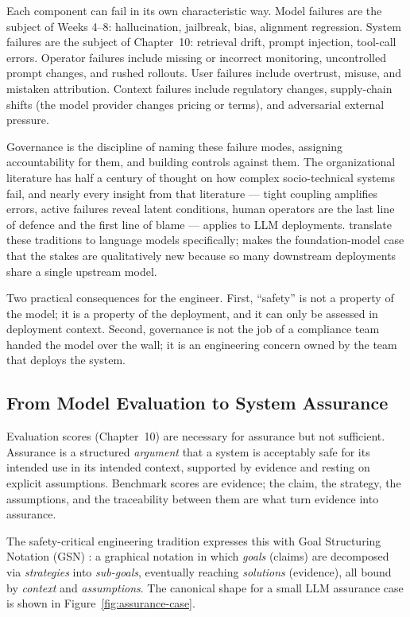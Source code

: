 Each component can fail in its own characteristic way. Model
failures are the subject of Weeks 4--8: hallucination,
jailbreak, bias, alignment regression. System failures are the
subject of Chapter~10: retrieval drift, prompt injection, tool-call
errors. Operator failures include missing or incorrect
monitoring, uncontrolled prompt changes, and rushed rollouts.
User failures include overtrust, misuse, and mistaken
attribution. Context failures include regulatory changes,
supply-chain shifts (the model provider changes pricing or
terms), and adversarial external pressure.

Governance is the discipline of naming these failure modes,
assigning accountability for them, and building controls against
them. The organizational literature
\citep{perrow1999normal, reason1990human} has half a century of
thought on how complex socio-technical systems fail, and nearly
every insight from that literature --- tight coupling amplifies
errors, active failures reveal latent conditions, human
operators are the last line of defence and the first line of
blame --- applies to LLM deployments. \citet{weidinger2021ethical,
weidinger2023sociotechnical} translate these traditions to
language models specifically; \citet{bommasani2021opportunities}
makes the foundation-model case that the stakes are
qualitatively new because so many downstream deployments share a
single upstream model.

Two practical consequences for the engineer. First, ``safety'' is
not a property of the model; it is a property of the deployment,
and it can only be assessed in deployment context. Second,
governance is not the job of a compliance team handed the model
over the wall; it is an engineering concern owned by the team
that deploys the system.

\subsection{From Model Evaluation to System Assurance}

Evaluation scores (Chapter~10) are necessary for assurance but not
sufficient. Assurance is a structured \emph{argument} that a
system is acceptably safe for its intended use in its intended
context, supported by evidence and resting on explicit
assumptions. Benchmark scores are evidence; the claim, the
strategy, the assumptions, and the traceability between them are
what turn evidence into assurance.

The safety-critical engineering tradition
\citep{leveson2011engineering} expresses this with
Goal Structuring Notation (GSN) \citep{gsn2021}: a graphical
notation in which \emph{goals} (claims) are decomposed via
\emph{strategies} into \emph{sub-goals}, eventually reaching
\emph{solutions} (evidence), all bound by \emph{context} and
\emph{assumptions}. The canonical shape for a small LLM assurance
case is shown in Figure~\ref{fig:assurance-case}.

